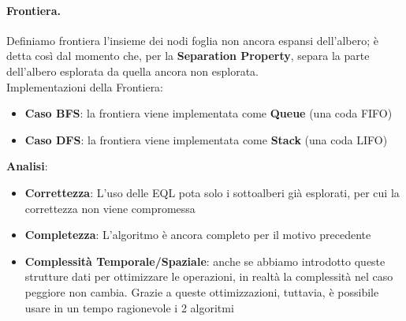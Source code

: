 \paragraph{Frontiera.}
Definiamo frontiera l'insieme dei nodi foglia non ancora espansi dell'albero; è detta così dal momento che, per la
\textbf{Separation Property}, separa la parte dell'albero esplorata da quella ancora non esplorata.\\
Implementazioni della Frontiera:
\begin{itemize}
    \item \textbf{Caso BFS}: la frontiera viene implementata come \textbf{Queue} (una coda FIFO)
    \item \textbf{Caso DFS}: la frontiera viene implementata come \textbf{Stack} (una coda LIFO)
\end{itemize}

\textbf{Analisi}:
\begin{itemize}
    \item \textbf{Correttezza}: L'uso delle EQL pota solo i sottoalberi già esplorati, per cui la correttezza non viene compromessa
    \item \textbf{Completezza}: L'algoritmo è ancora completo per il motivo precedente
    \item \textbf{Complessità Temporale/Spaziale}: anche se abbiamo introdotto queste strutture dati per ottimizzare le operazioni,
          in realtà la complessità nel caso peggiore non cambia. Grazie a queste ottimizzazioni, tuttavia, è possibile usare in un tempo ragionevole
          i 2 algoritmi
\end{itemize}
